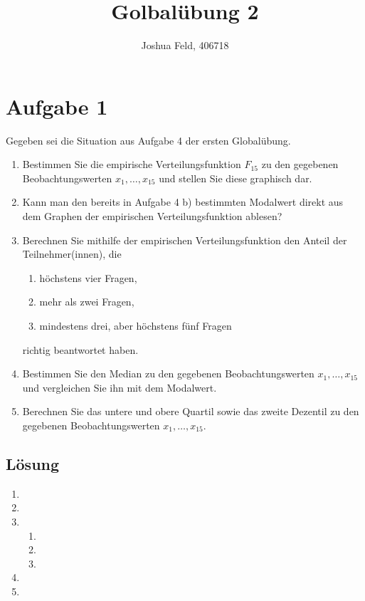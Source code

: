 \documentclass{exercise}
\institute{Institut für Statistik und Wirtschaftsmathematik}
\title{Golbalübung 2}
\author{Joshua Feld, 406718}
\begin{document}
    \maketitle


    \section*{Aufgabe 1}

    \begin{problem}
        Gegeben sei die Situation aus Aufgabe 4 der ersten Globalübung.
        \begin{enumerate}
            \item Bestimmen Sie die empirische Verteilungsfunktion \(F_{15}\) zu den gegebenen Beobachtungswerten \(x_1, \ldots, x_{15}\) und stellen Sie diese graphisch dar.
            \item Kann man den bereits in Aufgabe 4 b) bestimmten Modalwert direkt aus dem Graphen der empirischen Verteilungsfunktion ablesen?
            \item Berechnen Sie mithilfe der empirischen Verteilungsfunktion den Anteil der Teilnehmer(innen), die
            \begin{enumerate}
                \item höchstens vier Fragen,
                \item mehr als zwei Fragen,
                \item mindestens drei, aber höchstens fünf Fragen
            \end{enumerate}
            richtig beantwortet haben.
            \item Bestimmen Sie den Median zu den gegebenen Beobachtungswerten \(x_1, \ldots, x_{15}\) und vergleichen Sie ihn mit dem Modalwert.
            \item Berechnen Sie das untere und obere Quartil sowie das zweite Dezentil zu den gegebenen Beobachtungswerten \(x_1, \ldots, x_{15}\).
        \end{enumerate}
    \end{problem}

    \subsection*{Lösung}
    \begin{enumerate}
        \item
        \item
        \item
        \begin{enumerate}
            \item
            \item 
            \item
        \end{enumerate}
        \item
        \item 
    \end{enumerate}
\end{document}
